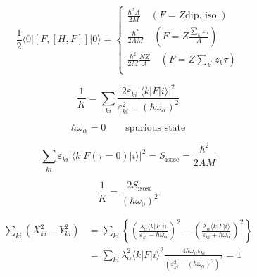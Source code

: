 \documentclass[a4paper,onecolumn,superscriptaddress,12pt,nofootinbib,twoside,raggedfooter,notitlepage]{revtex4-1}
\begin{document}
\vspace{0.5cm}
\begin{center}
\end{center}
\vspace{-0.5cm}

$$ \frac{1}{2} \langle 0 | \left[ F, [H,F] \right] | 0 \rangle = \begin{cases} 
	\frac{\hbar^2 A}{2M} \quad \left( F=Z \textrm{dip. iso.} \right) \\
	\frac{\hbar^2}{2AM} \quad \left( F=Z \frac{\sum_k z_n}{A} \right) \\
	\frac{\hbar^2}{2M} \frac{NZ}{A} \quad \left( F=Z \sum_{k^\prime} z_k \tau \right) \\	
\end{cases} $$

$$ \frac{1}{K} = \sum_{ki} \frac{2 \varepsilon_{ki} | \langle k | F| i \rangle |^2}{\varepsilon_{ki}^2 - (\hbar \omega_\alpha)^2} $$

$$ \hbar \omega_\alpha = 0 \qquad \textrm{spurious state} $$

\begin{center}
\end{center}

$$ \sum_{ki} \varepsilon_{ki} | \langle k | F(\tau=0) | i \rangle |^2 = S_\textrm{isosc} = \frac{\hbar^2}{2AM} $$

$$ \frac{1}{K} = \frac{2 S_\textrm{isosc}}{(\hbar \omega_0)^2} $$

\begin{center}
\end{center}

\begin{align*}
	\sum_{ki} \left( X_{ki}^2 - Y_{ki}^2 \right) &= \sum_{ki} \left\{ \left( \frac{\lambda_\alpha \langle k | F| i \rangle}{\varepsilon_{ki} - \hbar \omega_\alpha} \right)^2 - \left( \frac{\lambda_\alpha \langle k | F| i \rangle}{\varepsilon_{ki} + \hbar \omega_\alpha} \right)^2 \right\} \\
	&= \sum_{ki} \lambda_\alpha^2 \langle k | F| i \rangle^2 \frac{4 \hbar \omega_\alpha \varepsilon_{ki}}{\left( \varepsilon_{ki}^2 - (\hbar \omega_\alpha)^2 \right)^2} = 1
\end{align*}
\end{document}
